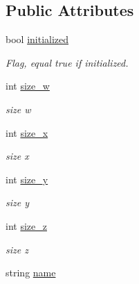 \subsection*{Public Attributes}
\begin{DoxyCompactItemize}
\item 
\hypertarget{class_matrix4_d_aea784137456de3f42c9687fd2f2b54e8}{}bool \hyperlink{class_matrix4_d_aea784137456de3f42c9687fd2f2b54e8}{initialized}\label{class_matrix4_d_aea784137456de3f42c9687fd2f2b54e8}

\begin{DoxyCompactList}\small\item\em Flag, equal true if initialized. \end{DoxyCompactList}\item 
\hypertarget{class_matrix4_d_a31cea34356ad05c4ceb7d30335dce12c}{}int \hyperlink{class_matrix4_d_a31cea34356ad05c4ceb7d30335dce12c}{size\+\_\+w}\label{class_matrix4_d_a31cea34356ad05c4ceb7d30335dce12c}

\begin{DoxyCompactList}\small\item\em size w \end{DoxyCompactList}\item 
\hypertarget{class_matrix4_d_a54dd815737a0dc10f0aa5e6275d07511}{}int \hyperlink{class_matrix4_d_a54dd815737a0dc10f0aa5e6275d07511}{size\+\_\+x}\label{class_matrix4_d_a54dd815737a0dc10f0aa5e6275d07511}

\begin{DoxyCompactList}\small\item\em size x \end{DoxyCompactList}\item 
\hypertarget{class_matrix4_d_a0aedb1cd50bb694fbf74eb7068069da8}{}int \hyperlink{class_matrix4_d_a0aedb1cd50bb694fbf74eb7068069da8}{size\+\_\+y}\label{class_matrix4_d_a0aedb1cd50bb694fbf74eb7068069da8}

\begin{DoxyCompactList}\small\item\em size y \end{DoxyCompactList}\item 
\hypertarget{class_matrix4_d_a8db60ddcda3b507665e2a4fb0dcf638a}{}int \hyperlink{class_matrix4_d_a8db60ddcda3b507665e2a4fb0dcf638a}{size\+\_\+z}\label{class_matrix4_d_a8db60ddcda3b507665e2a4fb0dcf638a}

\begin{DoxyCompactList}\small\item\em size z \end{DoxyCompactList}\item 
\hypertarget{class_matrix4_d_a2bf7df8b90fbb1bfab086bffa49526d0}{}string \hyperlink{class_matrix4_d_a2bf7df8b90fbb1bfab086bffa49526d0}{name}\label{class_matrix4_d_a2bf7df8b90fbb1bfab086bffa49526d0}


\end{DoxyCompactItemize}
